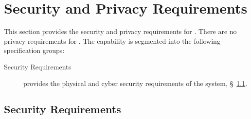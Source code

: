 \KNEADSECTIONNEWPAGE
\section{Security and Privacy Requirements}
\label{lab:sec_SecurityPrivacy}
% 

This section provides the security and privacy requirements for \ThisSys. There are no privacy requirements for \ThisSys.
The \ThisSys capability is segmented into the following specification groups:

\begin{description}
	\item [Security Requirements] provides the physical and cyber security requirements of the system, \S~\ref{lab:ssec_Security}.
\end{description}

\KNEADSUBSECTIONNEWPAGE
\subsection{Security Requirements}
\label{lab:ssec_Security}






